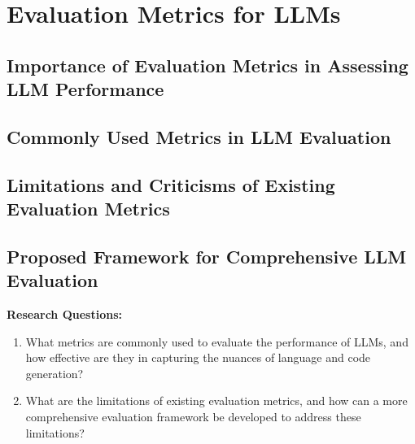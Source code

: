 
\chapter{Evaluation Metrics for LLMs}
\label{chap:evaluation_metrics}
\pagestyle{fancy}

\section{Importance of Evaluation Metrics in Assessing LLM Performance}

\section{Commonly Used Metrics in LLM Evaluation}

\section{Limitations and Criticisms of Existing Evaluation Metrics}

\section{Proposed Framework for Comprehensive LLM Evaluation}

\textbf{Research Questions:}
\begin{enumerate}
    \item What metrics are commonly used to evaluate the performance of LLMs, and how effective are they in capturing the nuances of language and code generation?
    \item What are the limitations of existing evaluation metrics, and how can a more comprehensive evaluation framework be developed to address these limitations?
\end{enumerate}
